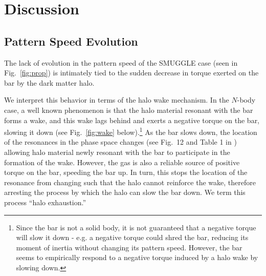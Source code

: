 \documentclass[twocolumn,linenumbers,trackchanges]{aastex631}
\newcommand{\Nbody}{$N$-body}
\newcommand{\SMUGGLE}{SMUGGLE}
\begin{document}
\section{Discussion}
\label{sec:discussion}
\subsection{Pattern Speed Evolution}
The lack of evolution in the pattern speed of the \SMUGGLE{} case (seen in
Fig.~\ref{fig:prop}) is intimately tied to the sudden decrease in torque exerted
on the bar by the dark matter halo. 

We interpret this behavior in terms of the halo wake mechanism. In the
\Nbody{} case, a well known phenomenon is that the halo material resonant with
the bar forms a wake, and this wake lags behind \citep{1984MNRAS.209..729T,
1985MNRAS.213..451W, 1992ApJ...400...80H} and exerts a negative torque on the
bar, slowing it down (see Fig.~\ref{fig:wake} below).\footnote{Since the bar is not a solid
body, it is not guaranteed that a negative torque will slow it down - e.g. a
negative torque could shred the bar, reducing its moment of inertia without
changing its pattern speed. However, the bar seems to empirically respond to a
negative torque induced by a halo wake by slowing down.} As the bar slows down,
the location of the resonances in the phase space changes (see Fig.~12 and Table
1 in \citet{2020ApJ...890..117D}) allowing halo material newly resonant with the
bar to participate in the formation of the wake. However, the gas is also a
reliable source of positive torque on the bar, speeding the bar up. In turn,
this stops the location of the resonance from changing such that the halo cannot
reinforce the wake, therefore arresting the process by which the halo can slow
the bar down. We term this process ``halo exhaustion.''

\end{document}
